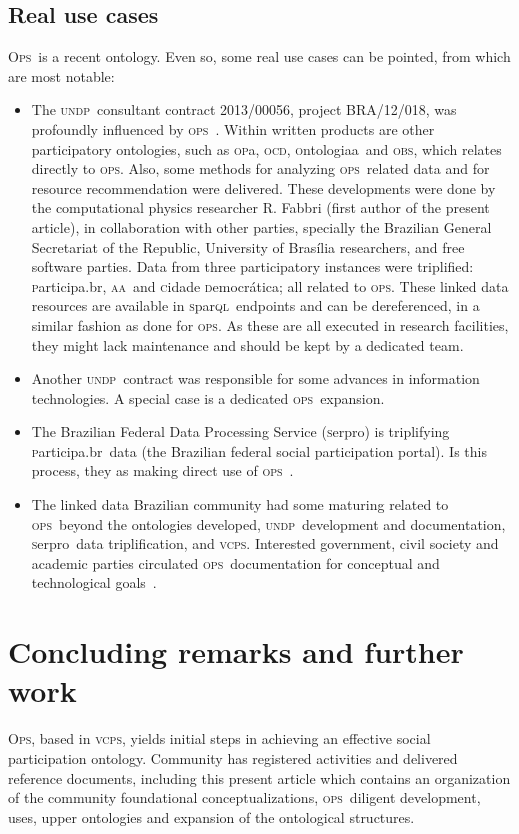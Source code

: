 \documentclass[10pt,letterpaper]{article}
\newcommand{\ops}{\textsc{ops}}
\newcommand{\opsi}{O\textsc{ps}}
\newcommand{\vcps}{\textsc{vcps}}
\newcommand{\sparql}{\textsc{s}par\textsc{ql}}
\newcommand{\opa}{\textsc{op}a}
\newcommand{\ocd}{\textsc{ocd}}
\newcommand{\ontologiaa}{\textsc{o}ntologiaa}
\newcommand{\obs}{\textsc{obs}}
\newcommand{\aan}{\textsc{aa}}
\newcommand{\cidadedemocratica}{\textsc{c}idade \textsc{d}emocr\'atica}
\newcommand{\participa}{\textsc{p}articipa.br}
\newcommand{\pnud}{\textsc{undp}}
\newcommand{\serpro}{\textsc{s}erpro}
\begin{document}
\subsection{Real use cases}\label{sec:real}
\opsi\ is a recent ontology.
Even so, some real use cases can be pointed, from which are most notable:
\begin{itemize}
    \item The \pnud\ consultant contract 2013/00056, project BRA/12/018,
    was profoundly influenced by \ops~\cite{pnud5}.
    Within written products are other participatory ontologies,
    such as \opa, \ocd, \ontologiaa\ and \obs,
    which relates directly to \ops.
    Also, some methods for analyzing \ops\ related data and for resource recommendation were delivered.
    These developments were done by the computational physics researcher R. Fabbri (first author of the present article),
    in collaboration with other parties, specially the Brazilian General Secretariat of the Republic,
    University of Bras\'ilia researchers, and free software parties.
    Data from three participatory instances were triplified:
    \participa, \aan\ and \cidadedemocratica; all related to \ops.
    These linked data resources are available in \sparql\ endpoints and can be dereferenced,
    in a similar fashion as done for \ops.
    As these are all executed in research facilities,
    they might lack maintenance and should be kept by a dedicated team.
    \item Another \pnud\ contract was responsible for some advances in information technologies.
    A special case is a dedicated \ops\ expansion\cite{paulo6}.
    \item The Brazilian Federal Data Processing Service (\serpro) is triplifying \participa\ data 
    (the Brazilian federal social participation portal). Is this process, they as making direct use of \ops~\cite{tripSerpro}.
    \item The linked data Brazilian community had some maturing related to \ops\ beyond the ontologies developed,
    \pnud\ development and documentation, \serpro\ data triplification, and \vcps.
    Interested government, civil society and academic parties circulated \ops\
    documentation for conceptual and technological goals~\cite{circulaOps1,circulaOps2}.
\end{itemize}

\section{Concluding remarks and further work}\label{conc}
\opsi, based in \vcps,
yields initial steps in achieving an effective social participation ontology.
Community has registered activities and delivered reference documents,
including this present article which contains 
an organization of the community foundational conceptualizations,
\ops\ diligent development, uses,
upper ontologies and expansion of the ontological structures.
\end{document}
